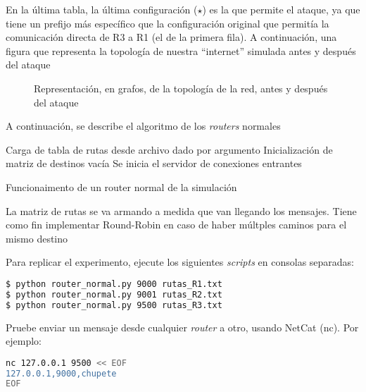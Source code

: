 \documentclass{article}
\begin{document}
En la última tabla, la última configuración ($\star$) es la que permite el ataque, ya que tiene un prefijo más específico que la configuración original que permitía la comunicación directa de R3 a R1 (el de la primera fila). A continuación, una figura que representa la topología de nuestra ``internet'' simulada antes y después del ataque

\begin{figure}[H]%
    \centering
    \qquad
    \caption{Representación, en grafos, de la topología de la red, antes y después del ataque}%
    \label{fig:example}%
\end{figure}

A continuación, se describe el algoritmo de los \textit{routers} normales

\begin{algorithm}[H]
\SetAlgoLined
{}
 Carga de tabla de rutas desde archivo dado por argumento\;
 Inicialización de matriz de destinos vacía\;
 Se inicia el servidor de conexiones entrantes\;
\caption{Funcionaimento de un router normal de la simulación}
\end{algorithm}

La matriz de rutas se va armando a medida que van llegando los mensajes. Tiene como fin implementar Round-Robin en caso de haber múltples caminos para el mismo destino

Para replicar el experimento, ejecute los siguientes \textit{scripts} en consolas separadas:

\begin{lstlisting}[language=bash, caption=Inicio de routers]
$ python router_normal.py 9000 rutas_R1.txt
$ python router_normal.py 9001 rutas_R2.txt
$ python router_normal.py 9500 rutas_R3.txt
\end{lstlisting}

Pruebe enviar un mensaje desde cualquier \textit{router} a otro, usando NetCat (nc). Por ejemplo:
\begin{lstlisting}[language=bash, caption=Ejemplo de transmisión de mensaje a R1 a través de R3]
nc 127.0.0.1 9500 << EOF
127.0.0.1,9000,chupete
EOF
\end{lstlisting}
\end{document}

